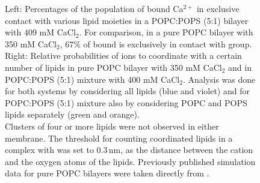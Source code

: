 \documentclass[journal=jpcbfk,manuscript=article]{achemso}
\begin{document}
\begin{figure}[tb!]
  \caption{ \label{fig:cacl_complexes} 
  Left: Percentages of the population of bound Ca$^{2+}$ 
in exclusive contact with various lipid moieties 
in a POPC:POPS (5:1) bilayer with 409 mM CaCl$_2$. 
For comparison, in a pure POPC bilayer with 350 mM CaCl$_2$, 
67\% of bound  is exclusively in contact with  group. \cite{melcr18} \\
    Right: Relative probabilities of  ions to coordinate with a certain number of lipids
    in pure POPC bilayer with 350 mM CaCl$_2$ and in POPC:POPS (5:1) mixture with 400 mM CaCl$_2$.  
    Analysis was done for both systems by considering all lipids (blue and violet) and
    for POPC:POPS (5:1) mixture also by considering POPC and POPS lipids separately (green and orange). \\
    Clusters of four or more lipids were not observed in either membrane.
    The threshold for counting coordinated lipids in a complex with  was set to $0.3\,\mathrm{nm}$, 
    as the distance between the cation and the oxygen atoms of the lipids. 
    Previously published simulation data \cite{melcr18} for pure POPC bilayers were taken directly from \cite{ECC-POPC_nacl_cacl2_files}. 
  }
\end{figure} 



\end{document}
